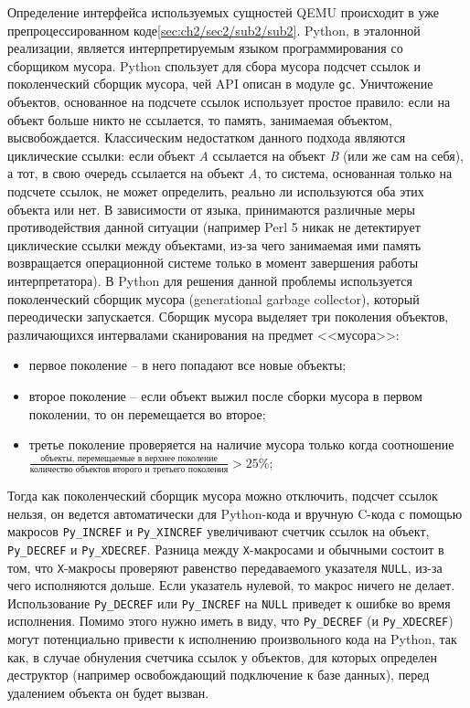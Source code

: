 Определение интерфейса используемых сущностей QEMU происходит в уже препроцессированном коде\cref{sec:ch2/sec2/sub2/sub2}.
Python, в эталонной реализации, является интерпретируемым языком программирования со сборщиком мусора.
Python спользует для сбора мусора подсчет ссылок и поколенческий сборщик мусора, чей API описан в модуле \texttt{gc}.
Уничтожение объектов, основанное на подсчете ссылок использует простое правило: если на объект больше
никто не ссылается, то память, занимаемая объектом, высвобождается.
Классическим недостатком данного подхода являются циклические ссылки: если объект \textit{A} ссылается
на объект \textit{B} (или же сам на себя), а тот, в свою очередь ссылается на объект \textit{A}, то система, основанная
только на подсчете ссылок, не может определить, реально ли используются оба этих объекта или нет.
В зависимости от языка, принимаются различные меры противодействия данной ситуации
(например Perl 5 никак не детектирует циклические ссылки между объектами,
из-за чего занимаемая ими память возвращается операционной системе только в момент завершения
работы интерпретатора).
В Python для решения данной проблемы используется поколенческий сборщик мусора (generational garbage collector),
который переодически запускается. Сборщик мусора выделяет три поколения объектов,
различающихся интервалами сканирования на предмет <<мусора>>:
\begin{itemize}
    \item первое поколение -- в него попадают все новые объекты;
    \item второе поколение -- если объект выжил после сборки мусора
        в первом поколении, то он перемещается во второе;
    \item третье поколение проверяется на наличие мусора только когда
        соотношение $\frac{\text{объекты, перемещаемые в верхнее поколение}}{\text{количество объектов второго и третьего поколения}} > 25\%$;
\end{itemize}

Тогда как поколенческий сборщик мусора можно отключить, подсчет ссылок нельзя, он ведется автоматически
для Python-кода и вручную C-кода с помощью макросов \texttt{Py\_INCREF} и \texttt{Py\_XINCREF}
увеличивают счетчик ссылок на объект, \texttt{Py\_DECREF} и \texttt{Py\_XDECREF}.
Разница между \texttt{X}-макросами и обычными состоит в том, что \texttt{X}-макросы
проверяют равенство передаваемого указателя \texttt{NULL}, из-за чего исполняются дольше.
Если указатель нулевой, то макрос ничего не делает.
Использование \texttt{Py\_DECREF} или \texttt{Py\_INCREF} на \texttt{NULL} приведет к ошибке во время исполнения.
Помимо этого нужно иметь в виду, что \texttt{Py\_DECREF} (и \texttt{Py\_XDECREF}) могут потенциально
привести к исполнению произвольного кода на Python, так как, в случае обнуления счетчика
ссылок у объектов, для которых определен деструктор (например освобождающий подключение к базе данных),
перед удалением объекта он будет вызван.


